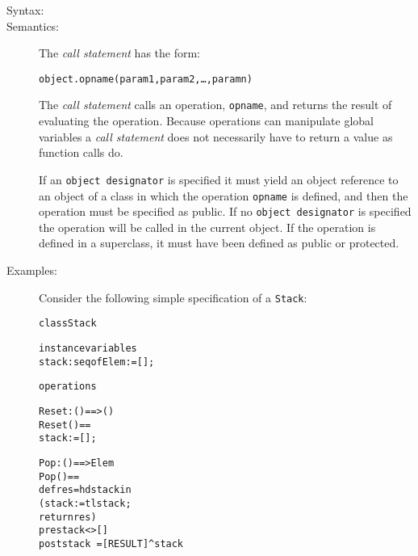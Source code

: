\documentclass[\pformat,12pt]{article}
\newcommand{\vppsmall}{\small\tt}
\begin{document}
\begin{description}
\item[Syntax:]



\item[Semantics:] The {\it call statement} has the form:

  \begin{alltt}
    object.opname(param1, param2, \ldots, paramn)
  \end{alltt}

  The {\it call statement} calls an operation, {\tt opname}, %
and returns the result of
  evaluating the operation. Because operations can manipulate global
  variables a {\it call statement} does not necessarily have to return
  a value as function calls do.

  If an {\vppsmall object designator} is specified it must yield an
  object reference to an object of a class in which the operation
  {\tt opname} is defined, and then the operation must be specified as
  public. If no {\tt object designator} is specified the
  operation will be called in the current object. If the operation is
  defined in a superclass, it must have been defined as public or
  protected. 

\item[Examples:] \mbox{} 

  Consider the following simple specification of a {\tt Stack}:

  \begin{alltt}
  class Stack

  instance variables
    stack: seq of Elem := [];

  operations

    \PUBLIC Reset: () ==> ()
    Reset() ==
      stack := []; 

    \PUBLIC Pop: () ==> Elem
    Pop() ==
      def res = hd stack in
       (stack := tl stack;
        return res)
    pre stack <> []
    post stack~ = [RESULT] ^ stack


\end{alltt}
\end{description}
\end{document}

